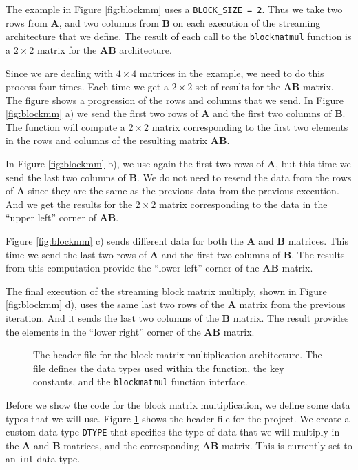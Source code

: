 The example in Figure \ref{fig:blockmm} uses a \lstinline{BLOCK_SIZE = 2}. Thus we take two rows from $\mathbf{A}$, and two columns from $\mathbf{B}$  on each execution of the streaming architecture that we define. The result of each call to the \lstinline{blockmatmul} function is a $2 \times 2$ matrix for the $\mathbf{AB}$ architecture.

Since we are dealing with $4 \times 4$ matrices in the example, we need to do this process four times. Each time we get a $2 \times 2$ set of results for the $\mathbf{AB}$ matrix. The figure shows a progression of the rows and columns that we send. In Figure \ref{fig:blockmm} a) we send the first two rows of $\mathbf{A}$ and the first two columns of $\mathbf{B}$. The function will compute a $2 \times 2$ matrix corresponding to the first two elements in the rows and columns of the resulting matrix $\mathbf{AB}$. 

In Figure \ref{fig:blockmm} b), we use again the first two rows of $\mathbf{A}$, but this time we send the last two columns of $\mathbf{B}$. We do not need to resend the data from the rows of $\mathbf{A}$ since they are the same as the previous data from the previous execution. And we get the results for the $2 \times 2$ matrix corresponding to the data in the ``upper left'' corner of $\mathbf{AB}$. 

Figure \ref{fig:blockmm} c) sends different data for both the $\mathbf{A}$ and $\mathbf{B}$ matrices. This time we send the last two rows of $\mathbf{A}$ and the first two columns of $\mathbf{B}$. The results from this computation provide the ``lower left'' corner of the $\mathbf{AB}$ matrix.

The final execution of the streaming block matrix multiply, shown in Figure \ref{fig:blockmm} d), uses the same last two rows of the $\mathbf{A}$ matrix from the previous iteration. And it sends the last two columns of the $\mathbf{B}$ matrix. The result provides the elements in the ``lower right'' corner of the $\mathbf{AB}$ matrix. 

\begin{figure}

\caption{  The header file for the block matrix multiplication architecture. The file defines the data types used within the function, the key constants, and the \lstinline{blockmatmul} function interface.   }
\label{fig:block_mm_h}
\end{figure}

Before we show the code for the block matrix multiplication, we define some data types that we will use. Figure \ref{fig:block_mm_h} shows the header file for the project. We create a custom data type \lstinline{DTYPE} that specifies the type of data that we will multiply in the $\mathbf{A}$ and $\mathbf{B}$ matrices, and the corresponding $\mathbf{AB}$ matrix. This is currently set to an \lstinline{int} data type.

